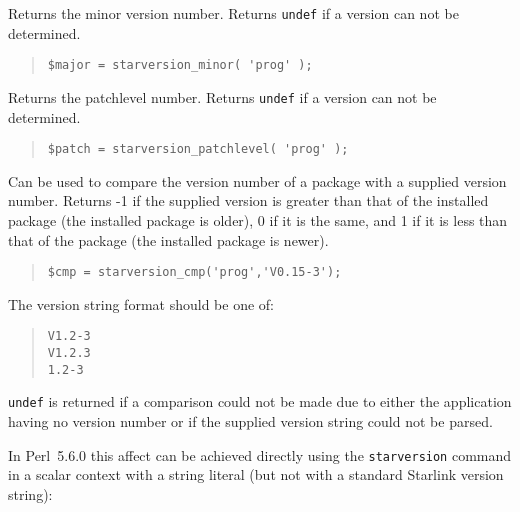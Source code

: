 \documentclass[twoside,11pt]{article}
\newenvironment{myquote}{\begin{quote}\begin{small}}{\end{small}\end{quote}}
\newcommand{\perl}{\xref{\textsf{Perl}}{sun193}{}}
\newcommand{\xref}[3]{#1}
\renewcommand{\_}{\texttt{\symbol{95}}}
\begin{document}
\begin{description}
Returns the minor version number. Returns \texttt{undef} if a version
can not be determined.

\begin{myquote}
\begin{verbatim}
$major = starversion_minor( 'prog' );
\end{verbatim}
\end{myquote} %

\item[starversion\_patchlevel] \mbox{}

Returns the patchlevel number. Returns \texttt{undef} if a version
can not be determined.

\begin{myquote}
\begin{verbatim}
$patch = starversion_patchlevel( 'prog' );
\end{verbatim}
\end{myquote} %

\item[starversion\_cmp] \mbox{}

  Can be used to compare the version number of a package with a supplied
  version number. Returns -1 if the supplied version is greater than that of
  the installed package (the installed package is older), 0 if it is the same,
  and 1 if it is less than that of the package (the installed package is
  newer).

\begin{myquote}
\begin{verbatim}
$cmp = starversion_cmp('prog','V0.15-3');
\end{verbatim}
\end{myquote} %

The version string format should be one of:

\begin{myquote}
\begin{verbatim}
V1.2-3
V1.2.3
1.2-3
\end{verbatim}
\end{myquote}

\texttt{undef} is returned if a comparison could not be made due to
either the application having no version number or if the
supplied version string could not be parsed.



In \perl\ 5.6.0 this affect can be achieved directly using
the \texttt{starversion} command in a scalar context with a string literal
(but not with a standard Starlink version string):


\end{description}
\end{document}
